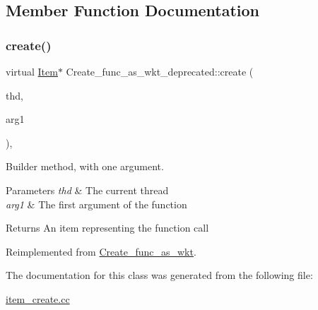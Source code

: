 \subsection{Member Function Documentation}
\mbox{\label{classCreate__func__as__wkt__deprecated_af3531afc26f4a9256096adc2291d497c}} 
\subsubsection{\texorpdfstring{create()}{create()}}
{\footnotesize\ttfamily virtual \mbox{\hyperlink{classItem}{Item}}$\ast$ Create\+\_\+func\+\_\+as\+\_\+wkt\+\_\+deprecated\+::create (\begin{DoxyParamCaption}\item[{T\+HD $\ast$}]{thd,  }\item[{\mbox{\hyperlink{classItem}{Item}} $\ast$}]{arg1 }\end{DoxyParamCaption})\hspace{0.3cm}{\ttfamily [inline]}, {\ttfamily [virtual]}}

Builder method, with one argument. 
\begin{DoxyParams}{Parameters}
{\em thd} & The current thread \\
\hline
{\em arg1} & The first argument of the function \\
\hline
\end{DoxyParams}
\begin{DoxyReturn}{Returns}
An item representing the function call 
\end{DoxyReturn}


Reimplemented from \mbox{\hyperlink{classCreate__func__as__wkt_ab99b74b6521f9894ce13159797180093}{Create\+\_\+func\+\_\+as\+\_\+wkt}}.



The documentation for this class was generated from the following file\+:\begin{DoxyCompactItemize}
\item 
\mbox{\hyperlink{item__create_8cc}{item\+\_\+create.\+cc}}\end{DoxyCompactItemize}
